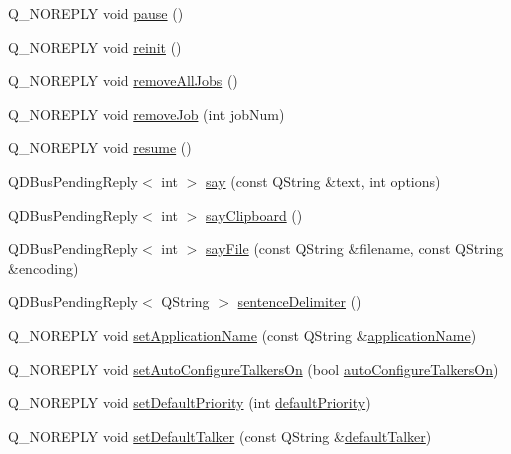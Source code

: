 \begin{DoxyCompactItemize}
Q\+\_\+\+N\+O\+R\+E\+P\+L\+Y void \hyperlink{classOrgKdeKSpeechInterface_a56a057343db44c7294eda6452d4015ba}{pause} ()
\item 
Q\+\_\+\+N\+O\+R\+E\+P\+L\+Y void \hyperlink{classOrgKdeKSpeechInterface_aa875ba899f9c8c547a623287ed182312}{reinit} ()
\item 
Q\+\_\+\+N\+O\+R\+E\+P\+L\+Y void \hyperlink{classOrgKdeKSpeechInterface_aff45e3007cb438284d9aa8b3fda05189}{remove\+All\+Jobs} ()
\item 
Q\+\_\+\+N\+O\+R\+E\+P\+L\+Y void \hyperlink{classOrgKdeKSpeechInterface_a746ff37ff134c24c62ae942a83771a39}{remove\+Job} (int job\+Num)
\item 
Q\+\_\+\+N\+O\+R\+E\+P\+L\+Y void \hyperlink{classOrgKdeKSpeechInterface_a09485512d3a11057d13bff7b13ec3d6d}{resume} ()
\item 
Q\+D\+Bus\+Pending\+Reply$<$ int $>$ \hyperlink{classOrgKdeKSpeechInterface_a383ff159fdaa04a40e084cea9cb528c1}{say} (const Q\+String \&text, int options)
\item 
Q\+D\+Bus\+Pending\+Reply$<$ int $>$ \hyperlink{classOrgKdeKSpeechInterface_aa7b61b47420e2863f5cd7b4574655816}{say\+Clipboard} ()
\item 
Q\+D\+Bus\+Pending\+Reply$<$ int $>$ \hyperlink{classOrgKdeKSpeechInterface_a2721a4857c61c47709034d8c8c942971}{say\+File} (const Q\+String \&filename, const Q\+String \&encoding)
\item 
Q\+D\+Bus\+Pending\+Reply$<$ Q\+String $>$ \hyperlink{classOrgKdeKSpeechInterface_a76c92f0804ef9142efbc30dc9c292714}{sentence\+Delimiter} ()
\item 
Q\+\_\+\+N\+O\+R\+E\+P\+L\+Y void \hyperlink{classOrgKdeKSpeechInterface_a7d483fb8e453eec2e82eb82573eddb9d}{set\+Application\+Name} (const Q\+String \&\hyperlink{classOrgKdeKSpeechInterface_a04f0f63a40f9d8786957512fbe381f6c}{application\+Name})
\item 
Q\+\_\+\+N\+O\+R\+E\+P\+L\+Y void \hyperlink{classOrgKdeKSpeechInterface_a70e977cc5ae133218e8ee95baba26aac}{set\+Auto\+Configure\+Talkers\+On} (bool \hyperlink{classOrgKdeKSpeechInterface_a2dfa018d5a0a66b8056414f5724101a7}{auto\+Configure\+Talkers\+On})
\item 
Q\+\_\+\+N\+O\+R\+E\+P\+L\+Y void \hyperlink{classOrgKdeKSpeechInterface_a035444cedcae485427220c29f47db347}{set\+Default\+Priority} (int \hyperlink{classOrgKdeKSpeechInterface_a25069da5cd0c44b8b9c328df5943d13c}{default\+Priority})
\item 
Q\+\_\+\+N\+O\+R\+E\+P\+L\+Y void \hyperlink{classOrgKdeKSpeechInterface_ac672dcc6c6640b0b947fa7b6b7af2453}{set\+Default\+Talker} (const Q\+String \&\hyperlink{classOrgKdeKSpeechInterface_a54996547b6db8130dd46af588d807d36}{default\+Talker})

\end{DoxyCompactItemize}
